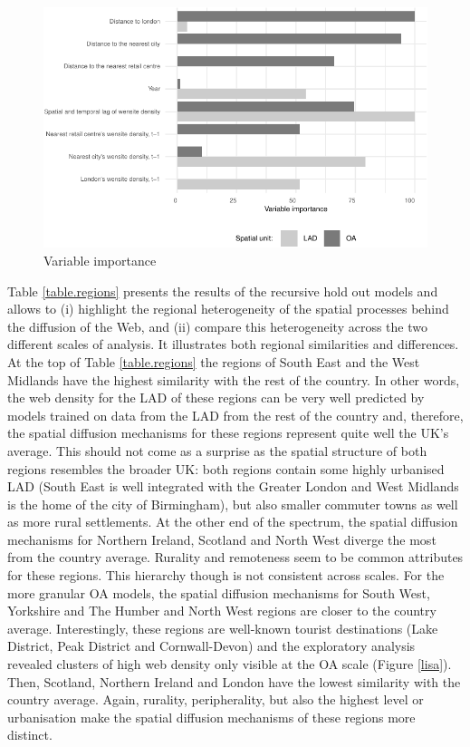 \documentclass[
  authoryear,
  preprint,
  3p]{elsarticle}
\begin{document}
\begin{figure}[H]

{\centering \includegraphics[width=1\textwidth,height=0.6\textheight]{tranos2025_files/figure-pdf/varimp-1.pdf}

}

\caption{\label{var.imp}Variable importance}

\end{figure}%

Table \ref{table.regions} presents the results of the recursive hold out
models and allows to (i) highlight the regional heterogeneity of the
spatial processes behind the diffusion of the Web, and (ii) compare this
heterogeneity across the two different scales of analysis. It
illustrates both regional similarities and differences. At the top of
Table \ref{table.regions} the regions of South East and the West
Midlands have the highest similarity with the rest of the country. In
other words, the web density for the LAD of these regions can be very
well predicted by models trained on data from the LAD from the rest of
the country and, therefore, the spatial diffusion mechanisms for these
regions represent quite well the UK's average. This should not come as a
surprise as the spatial structure of both regions resembles the broader
UK: both regions contain some highly urbanised LAD (South East is well
integrated with the Greater London and West Midlands is the home of the
city of Birmingham), but also smaller commuter towns as well as more
rural settlements. At the other end of the spectrum, the spatial
diffusion mechanisms for Northern Ireland, Scotland and North West
diverge the most from the country average. Rurality and remoteness seem
to be common attributes for these regions. This hierarchy though is not
consistent across scales. For the more granular OA models, the spatial
diffusion mechanisms for South West, Yorkshire and The Humber and North
West regions are closer to the country average. Interestingly, these
regions are well-known tourist destinations (Lake District, Peak
District and Cornwall-Devon) and the exploratory analysis revealed
clusters of high web density only visible at the OA scale (Figure
\ref{lisa}). Then, Scotland, Northern Ireland and London have the lowest
similarity with the country average. Again, rurality, peripherality, but
also the highest level or urbanisation make the spatial diffusion
mechanisms of these regions more distinct.
\end{document}
